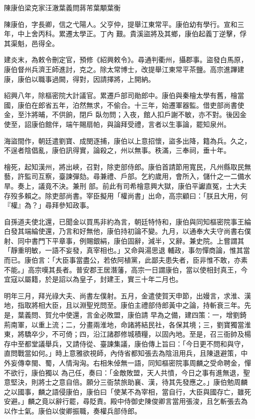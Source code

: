 
\begin{pinyinscope}

 陳康伯梁克家汪澈葉義問蔣芾葉顒葉衡



 陳康伯，字長卿，信之弋陽人。父亨仲，提舉江東常平。康伯幼有學行。宣和三年，中上舍丙科。累遷太學正。丁內
 艱。貴溪盜將及其鄉，康伯起義丁逆擊，俘其渠魁，邑得全。



 建炎末，為敕令刪定官，預修《紹興敕令》。尋通判衢州，攝郡事。盜發白馬原，康伯督州兵濟王師進討，克之。除太常博士，改提舉江東常平茶鹽。高宗進蹕建康，康伯以職事過闕，得對，因請擇將，上開納。



 紹興八年，除樞密院大計議官。累遷戶部司勛郎中。康伯與秦檜太學有舊，檜當國，康伯在郎省五年，泊然無求，不偷合。十三年，始遷軍器監。借吏部尚書使金，至汴將晡，不供餉，閉戶
 臥勿問；入夜，館人扣戶謝不敏，亦不對。後因金使至，詔康伯館伴，端午賜扇帕，與論拜受禮，言者以生事論，罷知泉州。



 海盜間作，朝廷遣劉寶、成閔逐捕，康伯以上意招懷，盜多出降，籍為兵。久之，不逞者陰倡亂，康伯訊得實，論殺之，州以無事。秩滿，三奉祠，垂十年。



 檜死，起知漢州，將出峽，召對，除吏部侍郎。康伯首請節用寬民，凡州縣取民無藝，許監司互察，臺諫彈劾。尋兼禮、戶部。乞約歲用，會所入，儲什之一二備水旱。奏上，議竟不決。兼刑
 部。前此有司希檜意興大獄，康伯平讞直冤，士大夫存歿多賴之。除吏部尚書。宰臣擬用「權尚書」出命，高宗顧曰：「朕且大用，何『權』為？」尋拜參知政事。



 自孫道夫使北還，已聞金以買馬非約為言，朝廷特恃和，康伯與同知樞密院事王綸白發其端綸使還，乃言和好無他，康伯持初論不變。九月，以通奉大夫守尚書右僕射、同中書門下平章事，例賜銀絹，康伯固辭，減半，又辭。兼史院。上嘗謂其「靜重明敏，一語不妄發，真宰相也。」又命與湯思退
 輔政，事勿憚商論，惟其當而已。康伯言：「大臣事當盡公，若依阿植黨，此鄙夫患失者，臣非惟不敢，亦素不能。」高宗嘆其長者。普安郡王居潛藩，高宗一日謂康伯，當以使相封真王，今宜寇以屬籍，於是詔以為皇子，封建王，實三十年二月也。



 明年三月，拜光祿大夫、尚書左僕射。五月，金遣使賀天申節，出嫚言，求淮、漢地，指取將相大臣，且以淵聖兇問至。康伯主禮部侍郎黃中之論，持斬衰三年。先是，葉義問、賀允中使還，言金必敗盟，康伯請
 早為之備，建四策：一，增劉錡荊南軍，以重上流；二，分畫兩淮地，命諸將結民社，各保其境；三，劉寶獨當淮東，將驕卒少，不可倚；四，沿江諸郡修城積糧，以固內地。至是，召三衙帥及楊存中至都堂議舉兵，又請侍從、臺諫集議，康伯傳上旨曰：「今日更不問和與守，直問戰當如何。」時上意雅欲視師，內侍省都知張去為陰沮用兵，且陳退避策，中外妄傳幸閩、蜀，人情洶洶。右相朱倬無一語，同知樞密院事周麟之受命聘金，憚不欲行，康伯獨以
 為己任，奏曰：「金敵敗盟，天人共憤，今日之事有進無退，聖意堅決，則將士之意自倍。願分三衙禁旅助襄、漢，待其先發應之。」康伯勉周麟之以國事，麟之語侵康伯，康伯曰「使某不為宰相，當自行，大臣與國存亡，雖死安避。」麟之竟以辭行罷，尋貶責。殿中侍御史陳俊卿言當用張浚，且乞斬張去為以作士氣。康伯以俊卿振職，奏權兵部侍郎。




\end{pinyinscope}
